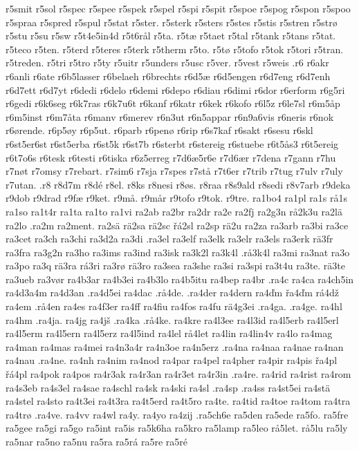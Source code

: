 {{r5smit
r5sol
r5spec
r5spee
r5spek
r5spel
r5spi
r5spit
r5spoe
r5spog
r5spon
r5spoo
r5spraa
r5spred
r5spul
r5stat
r5ster.
r5sterk
r5sters
r5stes
r5stis
r5stren
r5strø
r5stu
r5su
r5sw
r5t4e5in4d
r5t6rål
r5ta.
r5tæ
r5taet
r5tal
r5tank
r5tans
r5tat.
r5teco
r5ten.
r5terd
r5teres
r5terk
r5therm
r5to.
r5tø
r5tofo
r5tok
r5tori
r5tran.
r5treden.
r5tri
r5tro
r5ty
r5uitr
r5unders
r5usc
r5ver.
r5vest
r5weis
.r6
r6akr
r6anli
r6ate
r6b5lasser
r6belaeh
r6brechts
r6d5æ
r6d5engen
r6d7eng
r6d7enh
r6d7ett
r6d7yt
r6dedi
r6delo
r6demi
r6depo
r6diau
r6dimi
r6dor
r6erform
r6g5ri
r6gedi
r6k6seg
r6k7ras
r6k7u6t
r6kanf
r6katr
r6kek
r6kofo
r6l5z
r6le7sl
r6m5åp
r6m5inst
r6m7åta
r6manv
r6merev
r6n3ut
r6n5appar
r6n9a6vis
r6neris
r6nok
r6ørende.
r6p5øy
r6p5ut.
r6parb
r6penø
r6rip
r6s7kaf
r6sakt
r6sesu
r6skl
r6st5er6st
r6st5erba
r6st5k
r6st7b
r6sterbt
r6stereig
r6stuebe
r6t5ås3
r6t5ereig
r6t7o6s
r6tesk
r6testi
r6tiska
r6z5erreg
r7d6æ5r6e
r7d6ær
r7dena
r7gann
r7hu
r7nøt
r7omsy
r7rebart.
r7sim6
r7sja
r7spes
r7stå
r7t6er
r7trib
r7tug
r7ulv
r7uly
r7utan.
.r8
r8d7m
r8dé
r8el.
r8ks
r8nesi
r8øs.
r8raa
r8s9ald
r8sedi
r8v7arb
r9deka
r9dob
r9drad
r9fæ
r9ket.
r9må.
r9mår
r9tofo
r9tok.
r9tre.
ra1bo4
ra1pl
ra1s
rå1s
ra1so
ra1t4r
ra1ta
ra1to
ra1vi
ra2ab
ra2br
ra2dr
ra2e
ra2fj
ra2g3n
rå2k3u
ra2lä
ra2lo
.ra2m
ra2ment.
ra2sä
rä2sa
rä2sc
řá2sl
ra2sp
rä2u
ra2za
ra3arb
ra3bi
ra3ce
ra3cet
ra3ch
ra3chi
ra3d2a
ra3di
.ra3el
ra3elf
ra3elk
ra3elr
ra3els
ra3erk
rä3fr
ra3fra
ra3g2n
ra3ho
ra3ims
ra3ind
ra3isk
ra3k2l
ra3k4l
.rå3k4l
ra3mi
ra3nat
ra3o
ra3po
ra3q
rä3ra
rá3ri
ra3rø
rä3ro
ra3sea
ra3she
ra3si
ra3spi
ra3t4u
ra3te.
rä3te
ra3ueb
ra3vør
ra4b3ar
ra4b3ei
ra4b3lo
ra4b5itu
ra4bep
ra4br
.ra4c
ra4ca
ra4ch5in
ra4d3a4m
ra4d3an
.ra4d5ei
ra4dac
.rå4de.
.ra4der
ra4dern
ra4ďm
řa4ďm
rá4dž
ra4em
.rå4en
ra4es
ra4f3er
ra4ff
ra4fiu
ra4fos
ra4fu
rä4g3ei
.ra4ga.
.ra4ge.
ra4hl
ra4hm
.ra4ja.
ra4jg
ra4jš
.ra4ka
.rå4ke.
ra4kre
ra4l3ee
ra4l3id
ra4l5erb
ra4l5erl
ra4l5erm
ra4l5ern
ra4l5erz
ra4l5ind
ra4lel
rå4let
ra4lin
ra4lin4v
ra4lo
ra4mag
ra4man
ra4mas
ra4mei
ra4n3a4r
ra4n3oe
ra4n5erz
.ra4na
ra4naa
ra4nae
ra4nan
ra4nau
.ra4ne.
ra4nh
ra4nim
ra4nod
ra4par
ra4pel
ra4pher
ra4pir
ra4pis
řa4pl
řá4pl
ra4pok
ra4pos
ra4r3ak
ra4r3an
ra4r3et
ra4r3in
.ra4re.
ra4rid
ra4rist
ra4rom
ra4s3eb
ra4s3el
ra4sae
ra4schl
ra4sk
ra4ski
ra4sl
.ra4sp
.ra4ss
ra4st5ei
ra4stä
ra4stel
ra4sto
ra4t3ei
ra4t3ra
ra4t5erd
ra4t5ro
ra4te.
ra4tid
ra4toe
ra4tom
ra4tra
ra4trø
.ra4ve.
ra4vv
ra4wl
ra4y.
ra4yo
ra4zij
.ra5ch6e
ra5den
ra5ede
ra5fo.
ra5fre
ra5gee
ra5gi
ra5go
ra5int
ra5is
ra5k6ha
ra5kro
ra5lamp
ra5leo
rå5let.
rå5lu
ra5ly
ra5nar
ra5no
ra5nu
ra5ra
ra5rá
ra5re
ra5ré
}}
